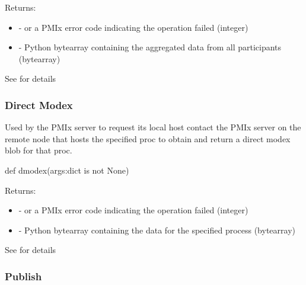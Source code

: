 Returns:
\begin{itemize}
    \item {} -  or a \ac{PMIx} error code indicating the operation failed (integer)
    \item {} - Python bytearray containing the aggregated data from all participants (bytearray)
\end{itemize}

See  for details

\subsubsection{Direct Modex}

\summary

Used by the PMIx server to request its local host contact the \ac{PMIx} server on the remote node that hosts the specified proc to obtain and return a direct modex blob for that proc.

\format

\pyspecificstart
\begin{codepar}
def dmodex(args:dict is not None)
\end{codepar}
\pyspecificend

\begin{arglist}
\end{arglist}

Returns:
\begin{itemize}
    \item {} -  or a \ac{PMIx} error code indicating the operation failed (integer)
    \item {} - Python bytearray containing the data for the specified process (bytearray)
\end{itemize}

See  for details

\subsubsection{Publish}

